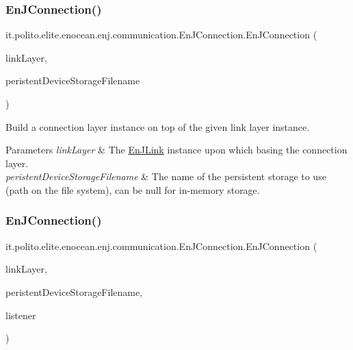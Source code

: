 \subsubsection{\texorpdfstring{En\+J\+Connection()}{EnJConnection()}\hspace{0.1cm}{\footnotesize\ttfamily [1/2]}}
{\footnotesize\ttfamily it.\+polito.\+elite.\+enocean.\+enj.\+communication.\+En\+J\+Connection.\+En\+J\+Connection (\begin{DoxyParamCaption}\item[{\hyperlink{classit_1_1polito_1_1elite_1_1enocean_1_1enj_1_1link_1_1_en_j_link}{En\+J\+Link}}]{link\+Layer,  }\item[{String}]{peristent\+Device\+Storage\+Filename }\end{DoxyParamCaption})}

Build a connection layer instance on top of the given link layer instance.


\begin{DoxyParams}{Parameters}
{\em link\+Layer} & The \hyperlink{}{En\+J\+Link} instance upon which basing the connection layer. \\
\hline
{\em peristent\+Device\+Storage\+Filename} & The name of the persistent storage to use (path on the file system), can be null for in-\/memory storage. \\
\hline
\end{DoxyParams}
\hypertarget{classit_1_1polito_1_1elite_1_1enocean_1_1enj_1_1communication_1_1_en_j_connection_a02d2c16708da5b40dea825a96e8d21e6}{}\label{classit_1_1polito_1_1elite_1_1enocean_1_1enj_1_1communication_1_1_en_j_connection_a02d2c16708da5b40dea825a96e8d21e6} 
\subsubsection{\texorpdfstring{En\+J\+Connection()}{EnJConnection()}\hspace{0.1cm}{\footnotesize\ttfamily [2/2]}}
{\footnotesize\ttfamily it.\+polito.\+elite.\+enocean.\+enj.\+communication.\+En\+J\+Connection.\+En\+J\+Connection (\begin{DoxyParamCaption}\item[{\hyperlink{classit_1_1polito_1_1elite_1_1enocean_1_1enj_1_1link_1_1_en_j_link}{En\+J\+Link}}]{link\+Layer,  }\item[{String}]{peristent\+Device\+Storage\+Filename,  }\item[{\hyperlink{interfaceit_1_1polito_1_1elite_1_1enocean_1_1enj_1_1communication_1_1_en_j_device_listener}{En\+J\+Device\+Listener}}]{listener }\end{DoxyParamCaption})}


